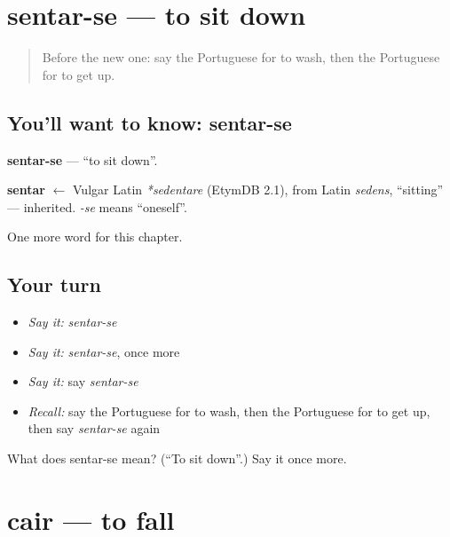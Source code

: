 \section[sentar-se]{sentar-se — to sit down}

\label{lesson:PT-C132-sentar-se}



\begin{quote}
Before the new one: say the Portuguese for to wash, then the Portuguese for to get up.
\end{quote}

\subsection*{You'll want to know: sentar-se}
\textbf{sentar-se} — \textquotedblleft{}to sit down\textquotedblright{}.

\begin{cousinweb}
\textbf{sentar} $\leftarrow$ Vulgar Latin \emph{*sedentare} (EtymDB 2.1), from Latin \emph{sedens}, \textquotedblleft{}sitting\textquotedblright{} — inherited. \emph{-se} means \textquotedblleft{}oneself\textquotedblright{}.
\end{cousinweb}

\begin{grammarlens}[title={What you've built}]
One more word for this chapter.
\end{grammarlens}

\subsection*{Your turn}
\begin{itemize}
\raggedright
  \item \emph{Say it:} \emph{sentar-se}
  \item \emph{Say it:} \emph{sentar-se}, once more
  \item \emph{Say it:} say \emph{sentar-se}
  \item \emph{Recall:} say the Portuguese for to wash, then the Portuguese for to get up, then say \emph{sentar-se} again
\end{itemize}

\begin{tcolorbox}[breakable,colback=teal!4,colframe=teal!35!black,title={Before you move on}]
What does sentar-se mean? (\textquotedblleft{}To sit down\textquotedblright{}.) Say it once more.
\end{tcolorbox}
\section[cair]{cair — to fall}


